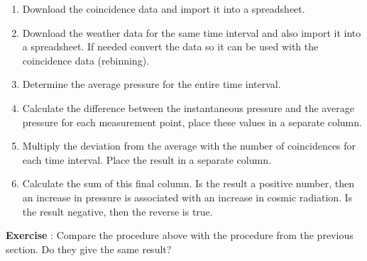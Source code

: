 \documentclass[12pt,a4paper]{article}
\numberwithin{equation}{section}
\numberwithin{figure}{section}
\newcounter{Exercise}
\numberwithin{table}{section}
\begin{document}
\begin{enumerate}[1]
\item Download the coincidence data and import it into a spreadsheet.
\item Download the weather data for the same time interval and also import it into a spreadsheet. If needed convert the data so it can be used with the coincidence data (rebinning).
\item Determine the average pressure for the entire time interval.
\item Calculate the difference between the instantaneous pressure and the average pressure for each measurement point, place these values in a separate column.
\item Multiply the deviation from the average with the number of coincidences for each time interval. Place the result in a separate column.
\item Calculate the sum of this final column. Is the result a positive number, then an increase in pressure is associated with an increase in cosmic radiation. Is the result negative, then the reverse is true. 
\end{enumerate}

\begin{shaded}
\textbf{Exercise \theExercise {}} : Compare the procedure above with the procedure from the previous section. Do they give the same result?\end{shaded}
\end{document}
